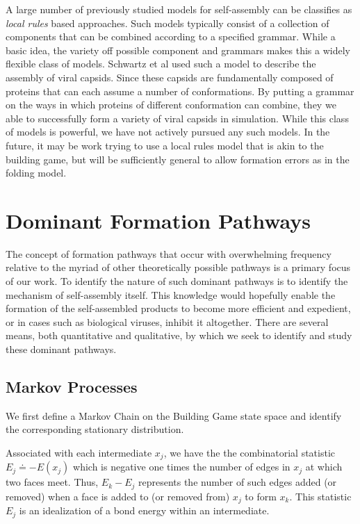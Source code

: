 A large number of previously studied models for self-assembly can be classifies as \textit{local rules} based approaches. Such models typically consist of a collection of components that can be combined according to a specified grammar. While a basic idea, the variety off possible component and grammars makes this a widely flexible class of models. Schwartz et al used such a model to describe the assembly of viral capsids. Since these capsids are fundamentally composed of proteins that can each assume a number of conformations. By putting a grammar on the ways in which proteins of different conformation can combine, they we able to successfully form a variety of viral capsids in simulation. While this class of models is powerful, we have not actively pursued any such models. In the future, it may be work trying to use a local rules model that is akin to the building game, but will be sufficiently general to allow formation errors as in the folding model.    

\section{Dominant Formation Pathways}

The concept of formation pathways that occur with overwhelming frequency relative to the myriad of other theoretically possible pathways is a primary focus of our work. To identify the nature of such dominant pathways is to identify the mechanism of self-assembly itself. This knowledge would hopefully enable the formation of the self-assembled products to become more efficient and expedient, or in cases such as biological viruses, inhibit it altogether. There are several means, both quantitative and qualitative, by which we seek to identify and study these dominant pathways. 

\subsection{Markov Processes}


We first define a Markov Chain on the Building Game state space and identify the corresponding stationary distribution. 

Associated with each intermediate $x_j$, we have the the combinatorial statistic $E_j \doteq -E(x_j)$ which is negative one times the number of edges in $x_j$ at which two faces meet. Thus, $E_k-E_j$ represents the number of such edges added (or removed) when a face is added to (or removed from) $x_j$ to form $x_k$. This statistic $E_j$ is an idealization of a bond energy within an intermediate.

